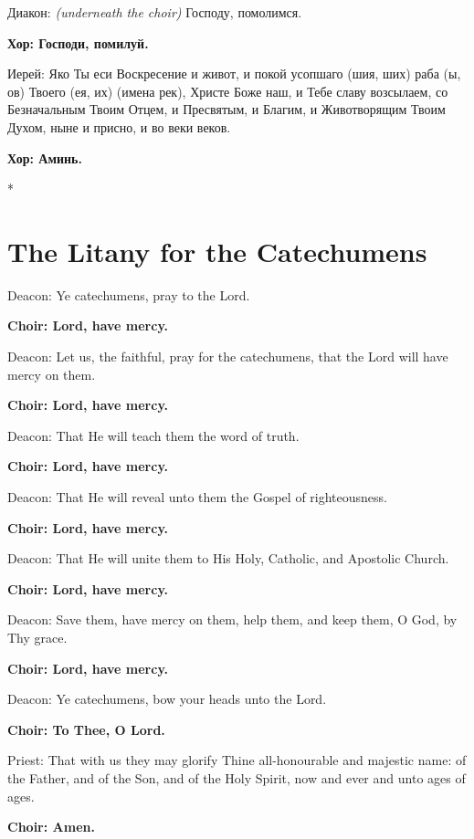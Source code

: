 \documentclass[12pt,a4paper,titlepage]{report}
\begin{document}
\begin{paracol}[1]{2}
	Диакон: \textit{\foreignlanguage{english}{(underneath the choir)}} Господу, помолимся.
	
	\textbf{Хор: Господи, помилуй.}
	
	Иерей: Яко Ты еси Воскресение и живот, и покой усопшаго (шия, ших) раба (ы, ов) Твоего (ея, их) (имена рек), Христе Боже наш, и Тебе славу возсылаем, со Безначальным Твоим Отцем, и Пресвятым, и Благим, и Животворящим Твоим Духом, ныне и присно, и во веки веков.
	
	\textbf{Хор: Аминь.}
	
	\switchcolumn[0]*
	
	\section*{The Litany for the Catechumens}
	
	Deacon: Ye catechumens, pray to the Lord.
	
	\textbf{Choir: Lord, have mercy.}
	
	Deacon: Let us, the faithful, pray for the catechumens, that the Lord will have mercy on them.
	
	\textbf{Choir: Lord, have mercy.}
	
	Deacon: That He will teach them the word of truth.
	
	\textbf{Choir: Lord, have mercy.}
	
	Deacon: That He will reveal unto them the Gospel of righteousness.
	
	\textbf{Choir: Lord, have mercy.}
	
	Deacon: That He will unite them to His Holy, Catholic, and Apostolic Church.
	
	\textbf{Choir: Lord, have mercy.}
	
	Deacon: Save them, have mercy on them, help them, and keep them, O God, by Thy grace.
	
	\textbf{Choir: Lord, have mercy.}
	
	Deacon: Ye catechumens, bow your heads unto the Lord.
	
	\textbf{Choir: To Thee, O Lord.}
	
	Priest: That with us they may glorify Thine all-honourable and majestic name: of the Father, and of the Son, and of the Holy Spirit, now and ever and unto ages of ages.
	
	\textbf{Choir: Amen.}
	
	\switchcolumn[1]
	

\end{paracol}
\end{document}

